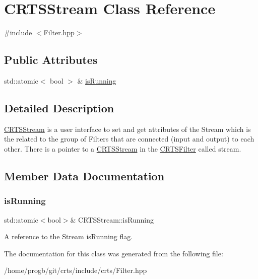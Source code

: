 \hypertarget{classCRTSStream}{}\section{C\+R\+T\+S\+Stream Class Reference}
\label{classCRTSStream}


{\ttfamily \#include $<$Filter.\+hpp$>$}

\subsection*{Public Attributes}
\begin{DoxyCompactItemize}
\item 
std\+::atomic$<$ bool $>$ \& \hyperlink{classCRTSStream_a7e13601716c40aa964416bbaef703a43}{is\+Running}
\end{DoxyCompactItemize}


\subsection{Detailed Description}
\hyperlink{classCRTSStream}{C\+R\+T\+S\+Stream} is a user interface to set and get attributes of the Stream which is the related to the group of Filters that are connected (input and output) to each other. There is a pointer to a \hyperlink{classCRTSStream}{C\+R\+T\+S\+Stream} in the \hyperlink{classCRTSFilter}{C\+R\+T\+S\+Filter} called stream. 

\subsection{Member Data Documentation}
\mbox{\label{classCRTSStream_a7e13601716c40aa964416bbaef703a43}} 
\subsubsection{\texorpdfstring{is\+Running}{isRunning}}
{\footnotesize\ttfamily std\+::atomic$<$bool$>$\& C\+R\+T\+S\+Stream\+::is\+Running}

A reference to the Stream is\+Running flag. 

The documentation for this class was generated from the following file\+:\begin{DoxyCompactItemize}
\item 
/home/progb/git/crts/include/crts/Filter.\+hpp\end{DoxyCompactItemize}
